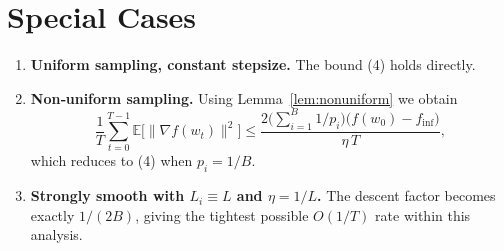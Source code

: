 \documentclass{article}
\begin{document}
\section*{Special Cases}
\begin{enumerate}[label=\alph*.]
\item \textbf{Uniform sampling, constant stepsize.} The bound (4) holds directly.

\item \textbf{Non‑uniform sampling.} Using Lemma~\ref{lem:nonuniform} we obtain
\[
\frac{1}{T}\sum_{t=0}^{T-1}\mathbb{E}\!\bigl[\|\nabla f(w_t)\|^{2}\bigr]
\le
\frac{2\bigl(\sum_{i=1}^{B}1/p_i\bigr)\bigl(f(w_{0})-f_{\inf}\bigr)}{\eta\,T},
\]
which reduces to (4) when $p_i=1/B$.

\item \textbf{Strongly smooth with $L_i\equiv L$ and $\eta=1/L$.} The descent factor becomes exactly $1/(2B)$, giving the tightest possible $O(1/T)$ rate within this analysis.

\end{enumerate}
\end{document}
